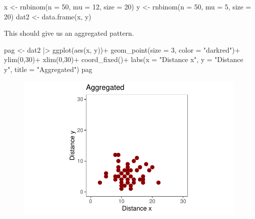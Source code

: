\documentclass[
  letterpaper,
  DIV=11,
  numbers=noendperiod]{scrreprt}
\newenvironment{Shaded}{\begin{snugshade}}{\end{snugshade}}
\newcommand{\AttributeTok}[1]{\textcolor[rgb]{0.40,0.45,0.13}{#1}}
\newcommand{\DecValTok}[1]{\textcolor[rgb]{0.68,0.00,0.00}{#1}}
\newcommand{\FunctionTok}[1]{\textcolor[rgb]{0.28,0.35,0.67}{#1}}
\newcommand{\NormalTok}[1]{\textcolor[rgb]{0.00,0.23,0.31}{#1}}
\newcommand{\OtherTok}[1]{\textcolor[rgb]{0.00,0.23,0.31}{#1}}
\newcommand{\SpecialCharTok}[1]{\textcolor[rgb]{0.37,0.37,0.37}{#1}}
\newcommand{\StringTok}[1]{\textcolor[rgb]{0.13,0.47,0.30}{#1}}
\begin{document}
\begin{Shaded}
\begin{Highlighting}[]
\NormalTok{x }\OtherTok{\textless{}{-}} \FunctionTok{rnbinom}\NormalTok{(}\AttributeTok{n =} \DecValTok{50}\NormalTok{, }\AttributeTok{mu =} \DecValTok{12}\NormalTok{, }\AttributeTok{size =} \DecValTok{20}\NormalTok{)}
\NormalTok{y }\OtherTok{\textless{}{-}} \FunctionTok{rnbinom}\NormalTok{(}\AttributeTok{n =} \DecValTok{50}\NormalTok{, }\AttributeTok{mu =} \DecValTok{5}\NormalTok{, }\AttributeTok{size =} \DecValTok{20}\NormalTok{)}
\NormalTok{dat2 }\OtherTok{\textless{}{-}} \FunctionTok{data.frame}\NormalTok{(x, y)}
\end{Highlighting}
\end{Shaded}

This should give us an aggregated pattern.

\begin{Shaded}
\begin{Highlighting}[]
\NormalTok{pag }\OtherTok{\textless{}{-}}\NormalTok{ dat2 }\SpecialCharTok{|\textgreater{}}
  \FunctionTok{ggplot}\NormalTok{(}\FunctionTok{aes}\NormalTok{(x, y))}\SpecialCharTok{+}
  \FunctionTok{geom\_point}\NormalTok{(}\AttributeTok{size =} \DecValTok{3}\NormalTok{, }\AttributeTok{color =} \StringTok{"darkred"}\NormalTok{)}\SpecialCharTok{+}
  \FunctionTok{ylim}\NormalTok{(}\DecValTok{0}\NormalTok{,}\DecValTok{30}\NormalTok{)}\SpecialCharTok{+}
  \FunctionTok{xlim}\NormalTok{(}\DecValTok{0}\NormalTok{,}\DecValTok{30}\NormalTok{)}\SpecialCharTok{+}
  \FunctionTok{coord\_fixed}\NormalTok{()}\SpecialCharTok{+}
  \FunctionTok{labs}\NormalTok{(}\AttributeTok{x =} \StringTok{"Distance x"}\NormalTok{, }\AttributeTok{y =} \StringTok{"Distance y"}\NormalTok{, }
       \AttributeTok{title =} \StringTok{"Aggregated"}\NormalTok{)}
\NormalTok{pag}
\end{Highlighting}
\end{Shaded}

\begin{figure}[H]

{\centering \includegraphics{./spatial-patterns_files/figure-pdf/unnamed-chunk-8-1.pdf}

}

\end{figure}
\end{document}
